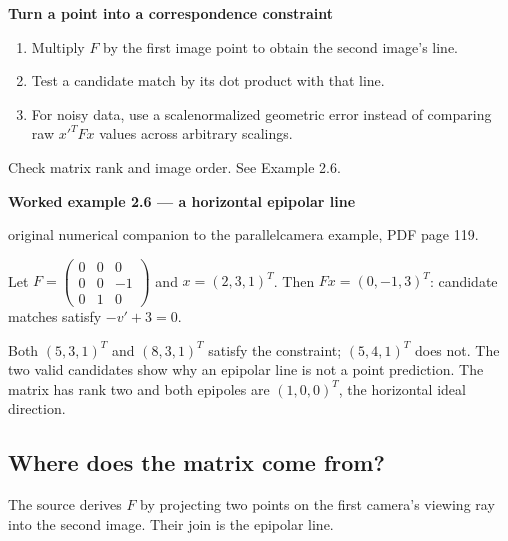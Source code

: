 \documentclass[letterpaper,11pt,english,openany,oneside]{jupyterBook}
\begin{document}
\begin{TextbookBox}
\textbf{Turn a point into a correspondence constraint}\par\smallskip
\begin{enumerate}
%
\item {}
\sphinxAtStartPar
Multiply \(F\) by the first image point to obtain the second image’s line.

\item {}
\sphinxAtStartPar
Test a candidate match by its dot product with that line.

\item {}
\sphinxAtStartPar
For noisy data, use a scale\sphinxhyphen{}normalized geometric error instead of comparing raw \(x'^TFx\) values across arbitrary scalings.

\end{enumerate}

\sphinxAtStartPar
Check matrix rank and image order. See Example 2.6.

\end{TextbookBox}
\label{\detokenize{lectures/lecture02/two-view:ex-lec02-fundamental}}
\begin{TextbookBox}
\textbf{Worked example 2.6 — a horizontal epipolar line}\par\smallskip

\sphinxAtStartPar
{} original numerical companion to the parallel\sphinxhyphen{}camera example, PDF page 119.

\sphinxAtStartPar
Let \(F=\begin{pmatrix}0&0&0\\0&0&-1\\0&1&0\end{pmatrix}\) and \(x=(2,3,1)^T\). Then \(Fx=(0,-1,3)^T\): candidate matches satisfy \(-v'+3=0\).

\sphinxAtStartPar
Both \((5,3,1)^T\) and \((8,3,1)^T\) satisfy the constraint; \((5,4,1)^T\) does not. The two valid candidates show why an epipolar line is not a point prediction. The matrix has rank two and both epipoles are \((1,0,0)^T\), the horizontal ideal direction.

\end{TextbookBox}


\subsection{Where does the matrix come from?}
\label{\detokenize{lectures/lecture02/two-view:where-does-the-matrix-come-from}}
\sphinxAtStartPar
The source derives \(F\) by projecting two points on the first camera’s viewing ray into the second image. Their join is the epipolar line.
\end{document}
